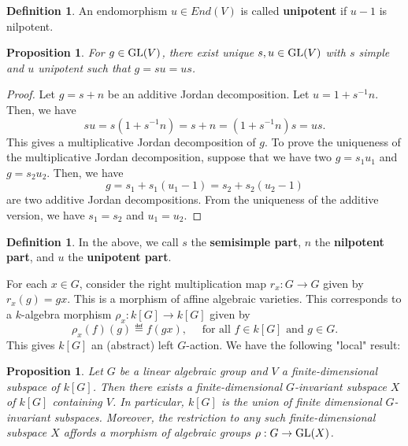 \documentclass[]{pcmi}
\theoremstyle{plain}
\newtheorem{Proposition}[equation]{Proposition}
\theoremstyle{definition}
\newtheorem{Definition}[equation]{Definition}
\begin{document}
\begin{Definition}
    An endomorphism $u \in End(V)$ is called \textbf{unipotent} if $u - 1$ is nilpotent. 
\end{Definition}

\begin{Proposition}
    For $g \in \operatorname{GL}(V)$, there exist unique $s, u \in \operatorname{GL}(V)$ with $s$ simple and $u$ unipotent such that $g = su = us$. 
\end{Proposition}

\begin{proof}
    Let $g = s + n$ be an additive Jordan decomposition. Let $u = 1 + s^{-1}n$. Then, we have 
    \[
        su = s(1 + s^{-1}n) = s + n = (1 + s^{-1}n)s =us. 
    \]
    This gives a multiplicative Jordan decomposition of $g$. To prove the uniqueness of the multiplicative Jordan decomposition, suppose that we have two $g = s_1 u_1$ and $g = s_2 u_2$. Then, we have 
    \[
        g = s_1 + s_1(u_1 - 1) = s_2 + s_2(u_2 - 1)
    \]
    are two additive Jordan decompositions. From the uniqueness of the additive version, we have $s_1 = s_2$ and $u_1 = u_2$. 
\end{proof}

\begin{Definition}
    In the above, we call $s$ the \textbf{semisimple part}, $n$ the \textbf{nilpotent part}, and $u$ the \textbf{unipotent part}. 
\end{Definition}

For each $x \in G$, consider the right multiplication map $r_x : G \to G$ given by $r_x(g) = gx$. This is a morphism of affine algebraic varieties. This corresponds to a $k$-algebra morphism $\rho_x : k[G] \to k[G]$ given by 
\[ 
    \rho_x(f)(g) \eqdef f(gx), \quad \text{ for all $f \in k[G]$ and $g \in G$}.
\]
This gives $k[G]$ an (abstract) left $G$-action. We have the following "local" result: 

\begin{Proposition}
    Let $G$ be a linear algebraic group and $V$ a finite-dimensional subspace of $k[G]$. Then there exists a finite-dimensional $G$-invariant subspace $X$ of $k[G]$ containing $V$. In particular, $k[G]$ is the union of finite dimensional $G$-invariant subspaces. Moreover, the restriction to any such finite-dimensional subspace $X$ affords a morphism of algebraic groups $\rho : G \to \operatorname{GL}(X)$. 
\end{Proposition}
\end{document}
